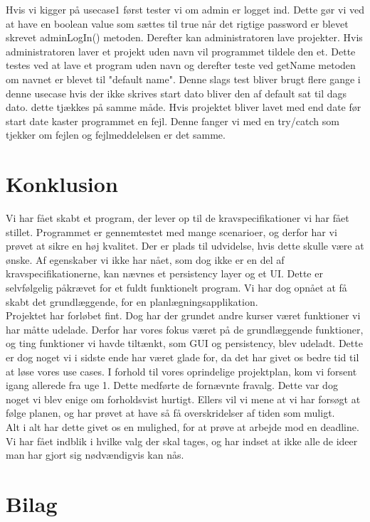 \documentclass[a4paper,12pt]{article}
\begin{document}
Hvis vi kigger på usecase1 først tester vi om admin er logget ind. Dette gør vi ved at have en boolean value som sættes til true når det rigtige password er blevet skrevet adminLogIn() metoden. Derefter kan administratoren lave projekter. Hvis administratoren laver et projekt uden navn vil programmet tildele den et. Dette testes ved at lave et program uden navn og derefter teste ved getName metoden om navnet er blevet til "default name". Denne slags test bliver brugt flere gange i denne usecase hvis der ikke skrives start dato bliver den af default sat til dags dato. dette tjækkes på samme måde. Hvis projektet bliver lavet med end date før start date kaster programmet en fejl. Denne fanger vi med en try/catch som tjekker om fejlen og fejlmeddelelsen er det samme.
\section{Konklusion}
Vi har fået skabt et program, der lever op til de kravspecifikationer vi har fået stillet. Programmet er gennemtestet med mange scenarioer, og derfor har vi prøvet at sikre en høj kvalitet. Der er plads til udvidelse, hvis dette skulle være at ønske. Af egenskaber vi ikke har nået, som dog ikke er en del af kravspecifikationerne, kan nævnes et persistency layer og et UI. Dette er selvfølgelig påkrævet for et fuldt funktionelt program. Vi har dog opnået at få skabt det grundlæggende, for en planlægningsapplikation.\\ 
Projektet har forløbet fint. Dog har der grundet andre kurser været funktioner vi har måtte udelade. Derfor har vores fokus været på de grundlæggende funktioner, og ting funktioner vi havde tiltænkt, som GUI og persistency, blev udeladt. Dette er dog noget vi i sidste ende har været glade for, da det har givet os bedre tid til at løse vores use cases. I forhold til vores oprindelige projektplan, kom vi forsent igang allerede fra uge 1. Dette medførte de fornævnte fravalg. Dette var dog noget vi blev enige om forholdsvist hurtigt. Ellers vil vi mene at vi har forsøgt at følge planen, og har prøvet at have så få overskridelser af tiden som muligt.\\
Alt i alt har dette givet os en mulighed, for at prøve at arbejde mod en deadline. Vi har fået indblik i hvilke valg der skal tages, og har indset at ikke alle de ideer man har gjort sig nødvændigvis kan nås.
\newpage
\section{Bilag}
\end{document}
